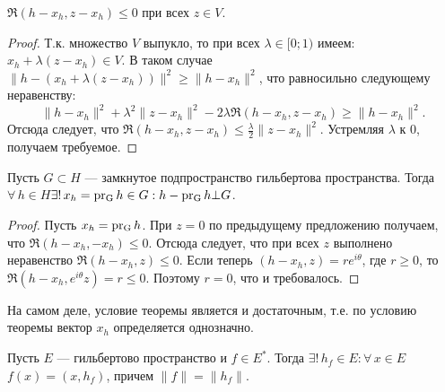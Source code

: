 \documentclass[12pt,titlepage, a4paper]{article}
\begin{document}
\begin{predl}
$\Re(h-x_h,z-x_h)\leqslant 0$ при всех $z\in V$.
\end{predl}

\begin{proof}
Т.к. множество $V$ выпукло, то при всех $\lambda\in[0;1)$ имеем:
$x_h+\lambda(z-x_h)\in V$. В таком случае
$\|h-(x_h+\lambda(z-x_h))\|^2\geqslant\|h-x_h\|^2$, что равносильно
следующему неравенству:
$$\|h-x_h\|^2+\lambda^2\|z-x_h\|^2-2\lambda\Re(h-x_h,z-x_h)\geqslant \|h-x_h\|^2.$$
Отсюда следует, что $\Re(h-x_h,z-x_h)\leqslant\frac\lambda 2
\|z-x_h\|^2$. Устремляя $\lambda $ к 0, получаем требуемое.
\end{proof}

\begin{theorem}
Пусть $G\subset H$ --- замкнутое подпространство гильбертова
пространства. Тогда $\forall\,h\in H$\;\;$\exists!\,x_h=\mathop{\mathrm{pr_{G}}}h\in
G:h-\mathop{\mathrm{pr_{G}}}h\bot G$.
\end{theorem}

\begin{proof}
Пусть $x_h=\mathop{\mathrm{pr_{G}}}h$. При $z=0$ по предыдущему предложению получаем,
что $\Re (h-x_h,-x_h)\leqslant 0$. Отсюда следует, что при всех $z$
выполнено неравенство $\Re(h-x_h,z)\leqslant 0$. Если теперь
$(h-x_h,z)=re^{i\theta}$, где $r\geqslant0$, то
$\Re(h-x_h,e^{i\theta}z)=r\leqslant0$. Поэтому $r=0$, что и
требовалось.
\end{proof}

\begin{zam}
На самом деле, условие теоремы является и достаточным, т.е. по
условию теоремы вектор $x_h$ определяется однозначно.
\end{zam}

\begin{theorem}[Рисс]
Пусть $E$ --- гильбертово пространство и $f\in E^*$. Тогда
$\exists!\,h_f\in E:\forall\,x\in E$\;\;$f(x)=(x,h_f)$, причем
$\|f\|=\|h_f\|$.
\end{theorem}
\end{document}
